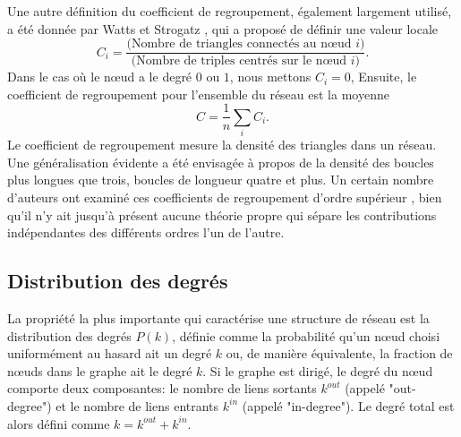 Une autre définition du coefficient de regroupement, également largement utilisé, a été donnée par Watts et Strogatz \cite{WS1998},
qui a proposé de définir une valeur locale
 \begin{equation}
    C_i=\frac{\text{(Nombre de triangles connectés au nœud $i$)}}{\text{(Nombre de triples centrés sur le nœud $i$)}}.
  \end{equation}
  Dans le cas où le nœud a le degré $0$ ou $1$, nous mettons $C_i=0$, Ensuite, le coefficient de regroupement pour l'ensemble
  du réseau est la moyenne
  \begin{equation}
    C=\frac{1}{n}\sum_i C_i.
  \end{equation}
 Le coefficient de regroupement mesure la densité des triangles dans un réseau. Une généralisation évidente a été envisagée à 
propos de la densité des boucles plus longues que trois, boucles de longueur quatre et plus. Un certain nombre d'auteurs ont 
examiné ces coefficients de regroupement d'ordre supérieur \cite{Ne2003,BC2003,Fron-al2002,Gle-al2001}, bien qu'il n'y ait jusqu'à présent
aucune théorie propre qui sépare les contributions indépendantes des différents ordres l'un de l'autre.
   \subsection{Distribution des degrés}
   La propriété la plus importante qui caractérise une structure de réseau est la distribution des degrés $P(k)$,
   définie comme la probabilité qu'un nœud choisi uniformément au hasard ait un degré $k$ ou, de manière équivalente, la
   fraction de nœuds dans le graphe ait le degré $k$.
   Si le graphe est dirigé, le degré du nœud comporte deux composantes: le nombre de liens sortants $k^{out}$ (appelé
   "out-degree") et le nombre de liens entrants $k^{in}$ (appelé "in-degree"). Le degré total est alors défini comme 
   $k=k^{out}+k^{in}$.\\

